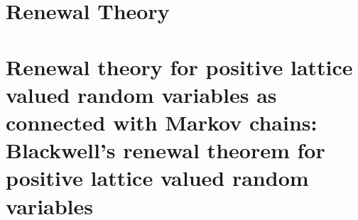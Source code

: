 \section{Renewal Theory}
\section{Renewal theory for positive lattice valued random variables as connected with Markov chains: Blackwell's renewal theorem for positive lattice valued random variables} 